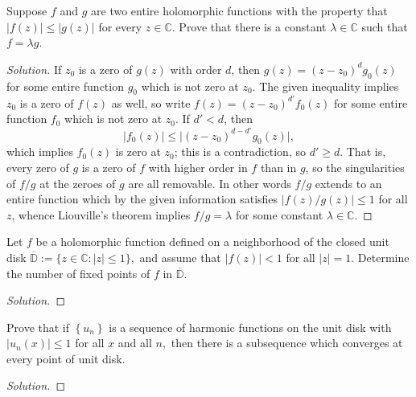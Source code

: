 \documentclass[10pt]{article}
\providecommand{\CC}{\mathbb C}
\newenvironment{soln}{\begin{proof}[Solution]}{\end{proof}}
\providecommand{\abs}[1]{\left\lvert #1\right\rvert}
\providecommand{\smabs}[1]{\lvert #1\rvert}
\begin{document}
\begin{problem}
[2015 J-I-1]
Suppose $f$ and $g$ are two entire holomorphic functions with the property that $|f(z)| \leq|g(z)|$ for every $z \in \mathbb{C}.$ Prove that there is a constant $\lambda \in \mathbb{C}$ such that $f=\lambda g.$
\end{problem}

\begin{soln}
    If $z_0$ is a zero of $g(z)$ with order $d$,
    then $g(z) = (z-z_0)^d g_0(z)$ for some entire function $g_0$
    which is not zero at $z_0$.
    The given inequality implies $z_0$ is a zero of $f(z)$ as well,
    so write $f(z) = (z-z_0)^{d'}f_0(z)$
    for some entire function $f_0$ which is not zero at $z_0$.
    If $d' < d$, then
    \begin{equation*}
	\abs{f_0(z)} \le \smabs{(z-z_0)^{d - d'} g_0(z)},
    \end{equation*}
    which implies $f_0(z)$ is zero at $z_0$;
    this is a contradiction, so $d'\ge d$.
    That is, every zero of $g$ is a zero of $f$
    with higher order in $f$ than in $g$,
    so the singularities of $f/g$ at the zeroes of $g$
    are all removable.
    In other words $f/g$ extends to an entire function
    which by the given information satisfies $\abs{f(z)/g(z)}\le 1$
    for all $z$, whence Liouville's theorem implies
    $f/g = \lambda$ for some constant $\lambda\in\CC$.
\end{soln}



\begin{problem}
[2015 A-I-3]
Let $f$ be a holomorphic function defined on a neighborhood of the closed unit disk $\overline{\mathbb{D}}:=\{z \in \mathbb{C}:|z| \leq 1\},$ and assume that $|f(z)|<1$ for all $|z|=1.$ Determine the number of fixed points of $f$ in $\overline{\mathbb{D}}.$
\end{problem}

\begin{soln}

\end{soln}



\begin{problem}
[2015 A-I-5]
Prove that if $\left\{u_n\right\}$ is a sequence of harmonic functions on the unit disk with $\left|u_n(x)\right| \leq 1$ for all $x$ and all $n,$ then there is a subsequence which converges at every point of unit disk.
\end{problem}

\begin{soln}

\end{soln}
\end{document}

